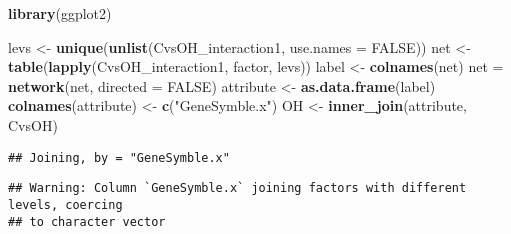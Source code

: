 \documentclass[]{article}
\newenvironment{Shaded}{\begin{snugshade}}{\end{snugshade}}
\newcommand{\DataTypeTok}[1]{\textcolor[rgb]{0.13,0.29,0.53}{#1}}
\newcommand{\DecValTok}[1]{\textcolor[rgb]{0.00,0.00,0.81}{#1}}
\newcommand{\FloatTok}[1]{\textcolor[rgb]{0.00,0.00,0.81}{#1}}
\newcommand{\KeywordTok}[1]{\textcolor[rgb]{0.13,0.29,0.53}{\textbf{#1}}}
\newcommand{\NormalTok}[1]{#1}
\newcommand{\OperatorTok}[1]{\textcolor[rgb]{0.81,0.36,0.00}{\textbf{#1}}}
\newcommand{\OtherTok}[1]{\textcolor[rgb]{0.56,0.35,0.01}{#1}}
\newcommand{\StringTok}[1]{\textcolor[rgb]{0.31,0.60,0.02}{#1}}
\begin{document}
\begin{Shaded}
\begin{Highlighting}[]
\KeywordTok{library}\NormalTok{(ggplot2)}

\NormalTok{levs <-}\StringTok{ }\KeywordTok{unique}\NormalTok{(}\KeywordTok{unlist}\NormalTok{(CvsOH_interaction1, }\DataTypeTok{use.names =} \OtherTok{FALSE}\NormalTok{))}
\NormalTok{net <-}\StringTok{ }\KeywordTok{table}\NormalTok{(}\KeywordTok{lapply}\NormalTok{(CvsOH_interaction1, factor, levs))}
\NormalTok{label <-}\StringTok{ }\KeywordTok{colnames}\NormalTok{(net)}
\NormalTok{net =}\StringTok{ }\KeywordTok{network}\NormalTok{(net, }\DataTypeTok{directed =} \OtherTok{FALSE}\NormalTok{)}
\NormalTok{attribute <-}\StringTok{ }\KeywordTok{as.data.frame}\NormalTok{(label)}
\KeywordTok{colnames}\NormalTok{(attribute) <-}\StringTok{ }\KeywordTok{c}\NormalTok{(}\StringTok{"GeneSymble.x"}\NormalTok{)}
\NormalTok{OH <-}\StringTok{ }\KeywordTok{inner_join}\NormalTok{(attribute, CvsOH)}
\end{Highlighting}
\end{Shaded}

\begin{verbatim}
## Joining, by = "GeneSymble.x"
\end{verbatim}

\begin{verbatim}
## Warning: Column `GeneSymble.x` joining factors with different levels, coercing
## to character vector
\end{verbatim}

\begin{Shaded}
\end{Shaded}
\end{document}
